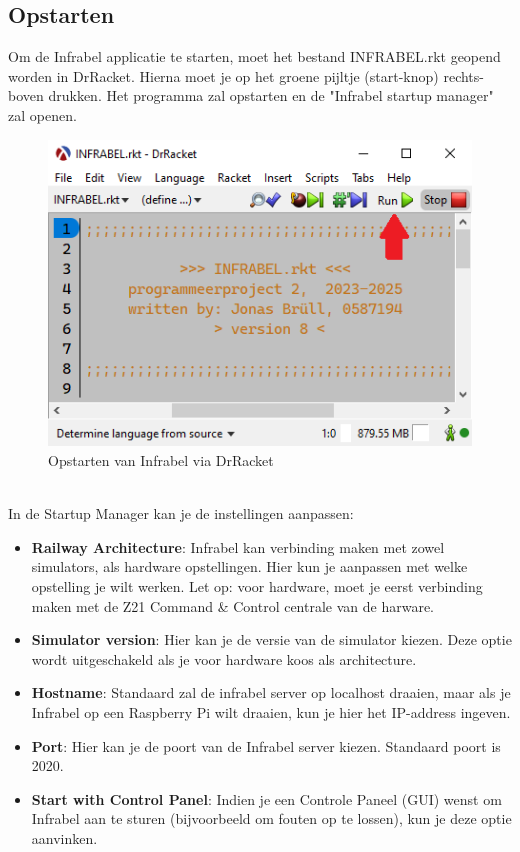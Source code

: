 \documentclass[a4paper, 11pt]{article}
\newcommand{\<}{\scriptsize\textless\normalsize}
\renewcommand{\>}{\scriptsize\textgreater\normalsize}
\begin{document}
\subsection{Opstarten} %
Om de Infrabel applicatie te starten, moet het bestand INFRABEL.rkt geopend worden in DrRacket. Hierna moet je op het groene pijltje (start-knop) rechts-boven drukken. Het programma zal opstarten en de "Infrabel startup manager" zal openen.
\begin{figure}[h]
	\begin{center}
		\includegraphics[scale=.5]{Bestanden/infrabel-rkt.png}
		\caption{Opstarten van Infrabel via DrRacket}
	\end{center}
\end{figure}
\\In de Startup Manager kan je de instellingen aanpassen:
\begin{itemize}
  \item \textbf{Railway Architecture}: Infrabel kan verbinding maken met zowel simulators, als hardware opstellingen. Hier kun je aanpassen met welke opstelling je wilt werken. Let op: voor hardware, moet je eerst verbinding maken met de Z21 Command \& Control centrale van de harware.
  \item \textbf{Simulator version}: Hier kan je de versie van de simulator kiezen. Deze optie wordt uitgeschakeld als je voor hardware koos als architecture.
  \item \textbf{Hostname}: Standaard zal de infrabel server op localhost draaien, maar als je Infrabel op een Raspberry Pi wilt draaien, kun je hier het IP-address ingeven.
  \item \textbf{Port}: Hier kan je de poort van de Infrabel server kiezen. Standaard poort is 2020.
  \item \textbf{Start with Control Panel}: Indien je een Controle Paneel (GUI) wenst om Infrabel aan te sturen (bijvoorbeeld om fouten op te lossen), kun je deze optie aanvinken.
\end{itemize}
\end{document}
